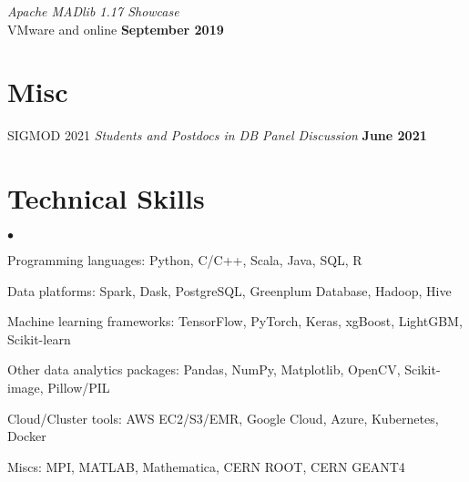 \documentclass[margin,line]{res}
\newenvironment{list2}{
 \begin{list}{$\bullet$}{%
   \setlength{\itemsep}{0in}
   \setlength{\parsep}{0in} \setlength{\parskip}{0in}
   \setlength{\topsep}{0in} \setlength{\partopsep}{0in} 
   \setlength{\leftmargin}{0.2in}}}{\end{list}}
\begin{document}
\begin{resume}
\vspace{-3mm}
\textit{Apache MADlib 1.17 Showcase}\\
VMware and online \hfill {\bf September 2019}\\


\section{\sc Misc}

SIGMOD 2021 \textit{Students and Postdocs in DB Panel Discussion} \hfill {\bf June 2021}




\section{\sc Technical Skills} 
\begin{list2}
\item Programming languages: Python, C/C++, Scala, Java, SQL, R
\item Data platforms: Spark, Dask, PostgreSQL, Greenplum Database, Hadoop, Hive
\item Machine learning frameworks: TensorFlow, PyTorch, Keras, xgBoost, LightGBM, Scikit-learn
\item Other data analytics packages: Pandas, NumPy, Matplotlib, OpenCV, Scikit-image, Pillow/PIL
\item Cloud/Cluster tools: AWS EC2/S3/EMR, Google Cloud, Azure, Kubernetes, Docker
\item Miscs: MPI, MATLAB, Mathematica, CERN ROOT, CERN GEANT4\\ 
\end{list2}



\end{resume}
\end{document}
